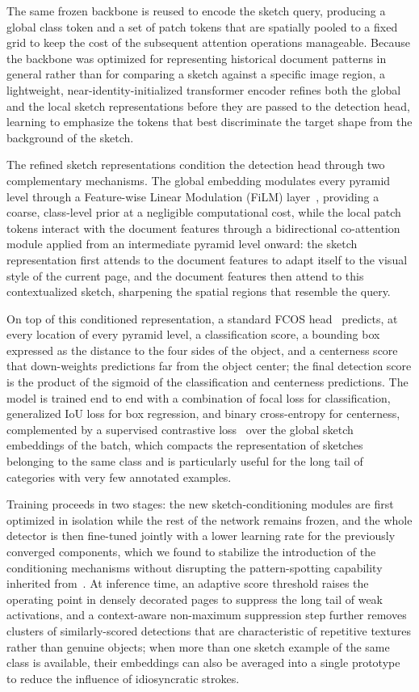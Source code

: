 \documentclass{iopjournal}
\begin{document}
The same frozen backbone is reused to encode the sketch query, producing a global class token and a set of patch tokens that are spatially pooled to a fixed grid to keep the cost of the subsequent attention operations manageable. Because the backbone was optimized for representing historical document patterns in general rather than for comparing a sketch against a specific image region, a lightweight, near-identity-initialized transformer encoder refines both the global and the local sketch representations before they are passed to the detection head, learning to emphasize the tokens that best discriminate the target shape from the background of the sketch.

The refined sketch representations condition the detection head through two complementary mechanisms. The global embedding modulates every pyramid level through a Feature-wise Linear Modulation (FiLM) layer~\cite{film2018}, providing a coarse, class-level prior at a negligible computational cost, while the local patch tokens interact with the document features through a bidirectional co-attention module applied from an intermediate pyramid level onward: the sketch representation first attends to the document features to adapt itself to the visual style of the current page, and the document features then attend to this contextualized sketch, sharpening the spatial regions that resemble the query.

On top of this conditioned representation, a standard FCOS head~\cite{fcos2019} predicts, at every location of every pyramid level, a classification score, a bounding box expressed as the distance to the four sides of the object, and a centerness score that down-weights predictions far from the object center; the final detection score is the product of the sigmoid of the classification and centerness predictions. The model is trained end to end with a combination of focal loss for classification, generalized IoU loss for box regression, and binary cross-entropy for centerness, complemented by a supervised contrastive loss~\cite{khosla2020supcon} over the global sketch embeddings of the batch, which compacts the representation of sketches belonging to the same class and is particularly useful for the long tail of categories with very few annotated examples.

Training proceeds in two stages: the new sketch-conditioning modules are first optimized in isolation while the rest of the network remains frozen, and the whole detector is then fine-tuned jointly with a lower learning rate for the previously converged components, which we found to stabilize the introduction of the conditioning mechanisms without disrupting the pattern-spotting capability inherited from~\cite{saavedra2024idoc}. At inference time, an adaptive score threshold raises the operating point in densely decorated pages to suppress the long tail of weak activations, and a context-aware non-maximum suppression step further removes clusters of similarly-scored detections that are characteristic of repetitive textures rather than genuine objects; when more than one sketch example of the same class is available, their embeddings can also be averaged into a single prototype to reduce the influence of idiosyncratic strokes.
\end{document}
